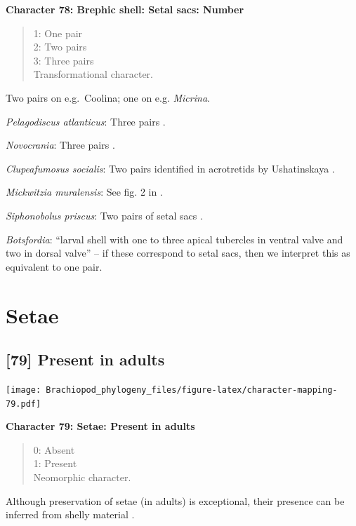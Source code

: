 \documentclass[]{book}
\theoremstyle{definition}
\theoremstyle{definition}
\theoremstyle{definition}
\theoremstyle{remark}
\begin{document}
\textbf{Character 78: Brephic shell: Setal sacs: Number}

\begin{quote}
1: One pair\\
2: Two pairs\\
3: Three pairs\\
Transformational character.
\end{quote}

Two pairs on e.g.~Coolina; one on e.g. \emph{Micrina}.

\emph{Pelagodiscus atlanticus}: Three pairs
\citep{Carlson1995Phylogeneticrelationships}.

\emph{Novocrania}: Three pairs
\citep{Carlson1995Phylogeneticrelationships}.

\emph{Clupeafumosus socialis}: Two pairs identified in acrotretids by
Ushatinskaya \citeyearpar{Ushatinskaya2016Protegulumand}.

\emph{Mickwitzia muralensis}: See fig. 2 in
\citet{Balthasar2009Thebrachiopod}.

\emph{Siphonobolus priscus}: Two pairs of setal sacs
\citep{Popov2009Earlyontogeny}.

\emph{Botsfordia}: ``larval shell with one to three apical tubercles in
ventral valve and two in dorsal valve''
\citep{Williams2000BrachiopodaLinguliformea} -- if these correspond to
setal sacs, then we interpret this as equivalent to one pair.

\hypertarget{setae}{%
\section{Setae}\label{setae}}

\hypertarget{present-in-adults}{%
\subsection*{{[}79{]} Present in adults}\label{present-in-adults}}

\texttt{[image: Brachiopod\_phylogeny\_files/figure-latex/character-mapping-79.pdf]}

\textbf{Character 79: Setae: Present in adults}

\begin{quote}
0: Absent\\
1: Present\\
Neomorphic character.
\end{quote}

Although preservation of setae (in adults) is exceptional, their
presence can be inferred from shelly material
\citep[see][]{Holmer2006Aspinose}.
\end{document}
